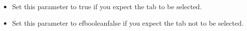 
\begin{itemize}
\item Set this parameter to true if you expect the tab to be selected.
\item Set this parameter to \jb{}efbooleanfalse if you expect the tab not to be selected.
\end{itemize}

